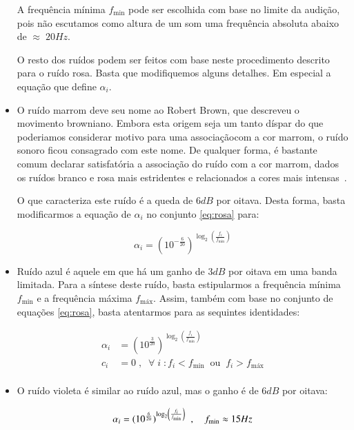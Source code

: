 \begin{itemize}
A frequência mínima $f_{\text{min}}$ pode ser escolhida com base no limite da audição, pois não escutamos como altura de um som uma frequência absoluta abaixo de $\approx\; 20Hz$.

O resto dos ruídos podem ser feitos com base neste procedimento descrito para 
o ruído rosa. Basta que modifiquemos alguns detalhes. Em especial a equação que define $\alpha_i$.

\item O ruído marrom deve seu nome ao Robert Brown, que descreveu o movimento browniano.
Embora esta origem seja um tanto díspar do que poderiamos considerar motivo para uma associaçãocom a cor marrom, o ruído sonoro ficou consagrado com este nome. De qualquer forma, é bastante comum declarar satisfatória a associação do ruído com a cor marrom, dados os ruídos branco e rosa mais estridentes e relacionados a cores mais intensas~\cite{marrom}.

O que caracteriza este ruído é a queda de $6dB$ por oitava. Desta forma, basta modificarmos a equação de $\alpha_i$ 
no conjunto \ref{eq:rosa} para:

\begin{equation}\label{eq:marrom}
\alpha_i=(10^{-\frac{6}{20}})^{\log _2 \left( \frac{f_i}{f_{\text{min}}} \right )}
\end{equation}

\item Ruído azul é aquele em que há um ganho de $3dB$ por oitava em uma banda limitada. Para
a síntese deste ruído, basta estipularmos a frequência mínima $f_{\text{min}}$ e a frequência
máxima $f_{\text{máx}}$. Assim, também com base no conjunto de equações \ref{eq:rosa}, 
basta atentarmos para as sequintes identidades:

\begin{equation}\label{eq:azul}
\begin{split}
\alpha_i & = (10^{\frac{3}{20}})^{\log _2 \left ( \frac{f_i}{f_{\text{min}}} \right )} \\
c_i & =0\;,\;\; \forall \; i \; : f_i<f_{\text{min}} \;\; \text{ou} \;\; f_i>f_{\text{máx}} \\
\end{split}
\end{equation}

\item O ruído violeta é similar ao ruído azul, mas o ganho é de $6dB$ por oitava:

\begin{equation}\label{eq:violeta}
\alpha_i = (10^{\frac{6}{20}})^{\log _2 \left ( \frac{f_i}{f_{\text{min}}} \right )} \;\;, \quad f_{\text{min}} \approx 15 Hz \\
\end{equation}


\end{itemize}
